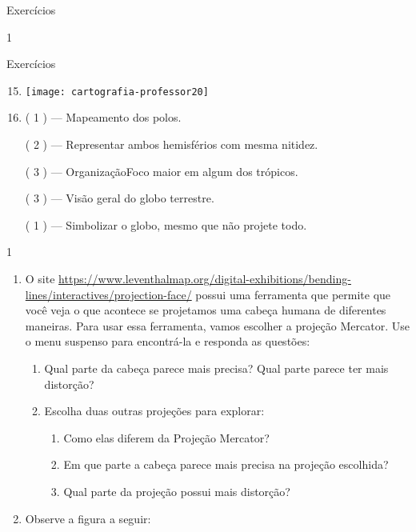 {\begin{answer}{Exercícios}
{\begin{enumerate}
	\end{enumerate}
}{1}
\end{answer}
\clearmargin
\begin{answer}{Exercícios}
{
	\exerciselist
	\begin{enumerate}\setcounter{enumi}{14}
	\item 
	{
	\texttt{[image: cartografia-professor20]}
	}

	\vspace{3em}
 	\item 
	({ }{1}{ }) --- Mapeamento dos polos.

	({ }{2}{ }) --- Representar ambos hemisférios com mesma nitidez.

	({ }{3}{ }) --- OrganizaçãoFoco maior em algum dos trópicos.

	({ }{3}{ }) --- Visão geral do globo terrestre.

	({ }{1}{ }) --- Simbolizar o globo, mesmo que não projete todo.
	\end{enumerate}

}{1}
\end{answer}

\begin{enumerate}

\item O site \url{https://www.leventhalmap.org/digital-exhibitions/bending-lines/interactives/projection-face/} possui uma ferramenta que permite que você veja o que acontece se projetamos uma cabeça humana de diferentes maneiras.  Para usar essa ferramenta, vamos escolher a projeção Mercator. Use o menu suspenso para encontrá-la e responda as questões:
\begin{enumerate}
\item Qual parte da cabeça parece mais precisa? Qual parte parece ter mais distorção?
\item Escolha duas outras projeções para explorar:
\begin{enumerate}
\item Como elas diferem da Projeção Mercator?
\item Em que parte  a cabeça parece mais precisa na projeção escolhida?
\item  Qual parte da projeção possui mais distorção?
\end{enumerate}
\end{enumerate}

\clearpage


\item Observe a figura a seguir: 


\end{enumerate}}

